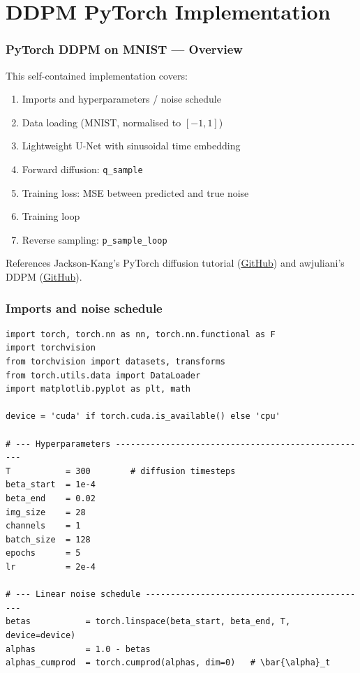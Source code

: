 \documentclass{beamer}
\begin{document}
\section{DDPM PyTorch Implementation}

\begin{frame}
\frametitle{PyTorch DDPM on MNIST — Overview}

This self-contained implementation covers:
\begin{enumerate}
  \item Imports and hyperparameters / noise schedule
  \item Data loading (MNIST, normalised to $[-1,1]$)
  \item Lightweight U-Net with sinusoidal time embedding
  \item Forward diffusion: \texttt{q\_sample}
  \item Training loss: MSE between predicted and true noise
  \item Training loop
  \item Reverse sampling: \texttt{p\_sample\_loop}
\end{enumerate}

\vspace{2mm}
\begin{block}{References}
Jackson-Kang's PyTorch diffusion tutorial
(\href{https://github.com/Jackson-Kang/Pytorch-Diffusion-Model-Tutorial}{GitHub})
and awjuliani's DDPM
(\href{https://github.com/awjuliani/pytorch-diffusion}{GitHub}).
\end{block}
\end{frame}

\begin{frame}
\frametitle{Imports and noise schedule}

\begin{verbatim}
import torch, torch.nn as nn, torch.nn.functional as F
import torchvision
from torchvision import datasets, transforms
from torch.utils.data import DataLoader
import matplotlib.pyplot as plt, math

device = 'cuda' if torch.cuda.is_available() else 'cpu'

# --- Hyperparameters ---------------------------------------------------
T           = 300        # diffusion timesteps
beta_start  = 1e-4
beta_end    = 0.02
img_size    = 28
channels    = 1
batch_size  = 128
epochs      = 5
lr          = 2e-4

# --- Linear noise schedule ---------------------------------------------
betas           = torch.linspace(beta_start, beta_end, T, device=device)
alphas          = 1.0 - betas
alphas_cumprod  = torch.cumprod(alphas, dim=0)   # \bar{\alpha}_t
\end{verbatim}
\end{frame}
\end{document}
